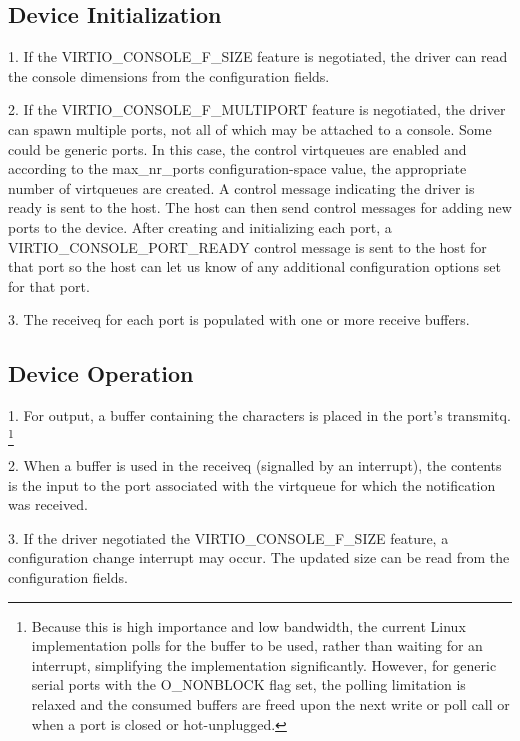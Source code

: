 \subsection{Device Initialization}\label{sec:Device Types / Console Device / Device Initialization}

1. If the VIRTIO_CONSOLE_F_SIZE feature is negotiated, the driver
  can read the console dimensions from the configuration fields.

2. If the VIRTIO_CONSOLE_F_MULTIPORT feature is negotiated, the
  driver can spawn multiple ports, not all of which may be
  attached to a console. Some could be generic ports. In this
  case, the control virtqueues are enabled and according to the
  max_nr_ports configuration-space value, the appropriate number
  of virtqueues are created. A control message indicating the
  driver is ready is sent to the host. The host can then send
  control messages for adding new ports to the device. After
  creating and initializing each port, a
  VIRTIO_CONSOLE_PORT_READY control message is sent to the host
  for that port so the host can let us know of any additional
  configuration options set for that port.

3. The receiveq for each port is populated with one or more
  receive buffers.

\subsection{Device Operation}\label{sec:Device Types / Console Device / Device Operation}

1. For output, a buffer containing the characters is placed in
  the port's transmitq.
\footnote{Because this is high importance and low bandwidth, the current
Linux implementation polls for the buffer to be used, rather than
waiting for an interrupt, simplifying the implementation
significantly. However, for generic serial ports with the
O_NONBLOCK flag set, the polling limitation is relaxed and the
consumed buffers are freed upon the next write or poll call or
when a port is closed or hot-unplugged.
}

2. When a buffer is used in the receiveq (signalled by an
  interrupt), the contents is the input to the port associated
  with the virtqueue for which the notification was received.

3. If the driver negotiated the VIRTIO_CONSOLE_F_SIZE feature, a
  configuration change interrupt may occur. The updated size can
  be read from the configuration fields.

